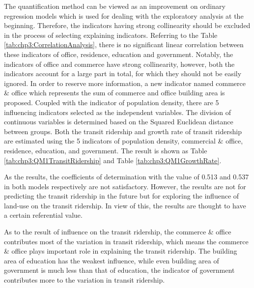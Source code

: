 %
The quantification method \uppercase\expandafter{} can be viewed as an improvement on ordinary regression models which is used for dealing with the exploratory analysis at the beginning. Therefore, the indicators having strong collinearity should be excluded in the process of selecting explaining indicators. Referring to the Table \ref{tab:chp3:CorrelationAnalysis}, there is no significant linear correlation between these indicators of office, residence, education and government. Notably, the indicators of office and commerce have strong collinearity, however, both the indicators account for a large part in total, for which they should not be easily ignored. In order to reserve more information, a new indicator named commerce \& office which represents the sum of commerce and office building area is proposed. Coupled with the indicator of population density, there are 5 influencing indicators selected as the independent variables. The division of continuous variables is determined based on the Squared Euclidean distance between groups. Both the transit ridership and growth rate of transit ridership are estimated using the 5 indicators of population density, commercial \& office, residence, education, and government. The result is shown as Table \ref{tab:chp3:QM1TransitRidership} and Table \ref{tab:chp3:QM1GrowthRate}.

%
As the results, the coefficients of determination with the value of 0.513 and 0.537 in both models respectively are not satisfactory. However, the results are not for predicting the transit ridership in the future but for exploring the influence of land-use on the transit ridership. In view of this, the results are thought to have a certain referential value. 

%
As to the result of influence on the transit ridership, the commerce \& office contributes most of the variation in transit ridership, which means the commerce \& office plays important role in explaining the transit ridership. The building area of education has the weakest influence, while even building area of government is much less than that of education, the indicator of government contributes more to the variation in transit ridership. 

